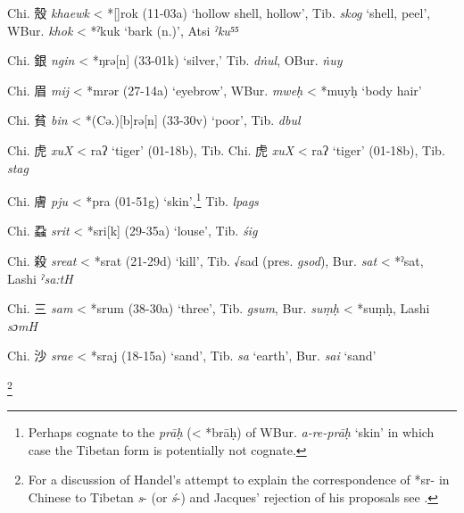 \begin{description} \item
Chi. 殼 \emph{khaewk} \textless{} *[{}]{}rok (11-03a) `hollow shell,
hollow', Tib. {} \emph{skog} `shell, peel', WBur. {} \emph{khok}
\textless{} *ˀkuk `bark (n.)', Atsi  \emph{ˀku⁵⁵}
\item
Chi. 銀 \emph{ngin} \textless{} *ŋrə[n] (33-01k) `silver,' Tib.{} \emph{dṅul}, OBur. {} \emph{ṅuy}
\item
Chi. 眉 \emph{mij} \textless{} *mrər (27-14a) `eyebrow', WBur. {} \emph{mweḥ} \textless{} *muyḥ `body hair'
\item
Chi. 貧 \emph{bin} \textless{} *(Cə.){[}b]rə[n] (33-30v) `poor',
Tib. {} \emph{dbul}
\item
Chi. 虎 \emph{xuX} \textless{} {}{}raʔ `tiger' (01-18b), Tib.
\protect\hypertarget{anchor-49}{}{}Chi. 虎 \emph{xuX} \textless{}
{}{}raʔ `tiger' (01-18b), Tib. {} \emph{stag}
\item
Chi. 膚 \emph{pju} \textless{} *pra (01-51g) `skin',\footnote{Perhaps
  cognate to the {} \emph{prāḥ} (\textless{} *brāḥ) of WBur. {} \emph{a-re-prāḥ} `skin' in which case the Tibetan form is potentially
  not cognate.} Tib. {} \emph{lpags}
\item
Chi. 蝨 \emph{srit} \textless{} *sri{[}k] (29-35a) `louse', Tib. {} \emph{śig}
\item
Chi. 殺 \emph{sreat} \textless{} *srat (21-29d) `kill', Tib. √sad (pres. {} \emph{gsod}), Bur. {} \emph{sat} \textless{} *ˀsat, Lashi
 \emph{ˀsa:tH}
 \item
Chi. 三 \emph{sam} \textless{} *srum (38-30a) `three', Tib. {} \emph{gsum}, Bur. {} \emph{suṃḥ} \textless{} *suṃḥ, Lashi  \emph{sɔmH}
\item
Chi. 沙 \emph{srae} \textless{} *s{}raj (18-15a) `sand', Tib. {} \emph{sa} `earth', Bur. {} \emph{sai} `sand'
\end{description}

\footnote{For a discussion of Handel's attempt to explain the correspondence of *sr- in
Chinese to Tibetan \emph{s}- (or \emph{ś}-) 
\citeyearpar[201-209]{Handel2009} and Jacques' 
\citeyearpar{jacques15sr}
rejection of his proposals see \citet[198-200]{hill2019phonology}.} 





